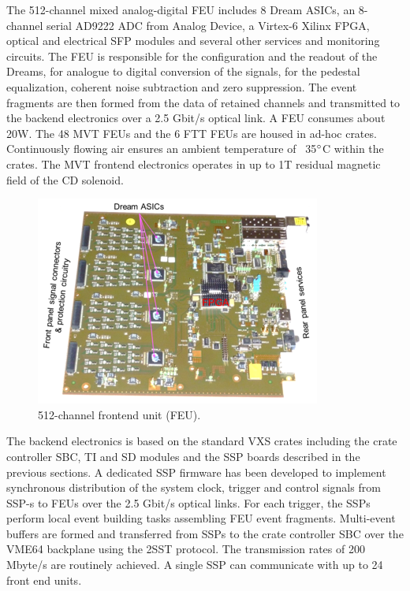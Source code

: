The 512-channel mixed analog-digital FEU includes 8 Dream ASICs, an 8-channel serial AD9222 ADC from Analog Device, a Virtex-6 Xilinx FPGA, optical and electrical SFP modules and several other services and monitoring circuits. The FEU is responsible for the configuration and the readout of the Dreams, for analogue to digital conversion of the signals, for the pedestal equalization, coherent noise subtraction and zero suppression. The event fragments are then formed from the data of retained channels and transmitted to the backend electronics over a 2.5 Gbit/s optical link. A FEU consumes about 20W. The 48 MVT FEUs and the 6 FTT FEUs are housed in ad-hoc crates. Continuously flowing air ensures an ambient temperature of ~35$\degree$C within the crates. The MVT frontend electronics operates in up to 1T residual magnetic field of the CD solenoid.

\begin{figure}[hbt]
	\centering
	\includegraphics[width=1.0\columnwidth,keepaspectratio]{img/mvt2.png}
	\caption{512-channel frontend unit (FEU).}
	\label{fig:mvt2}
\end{figure}

The backend electronics is based on the standard VXS crates including the crate controller SBC, TI and SD modules and the SSP boards described in the previous sections. A dedicated SSP firmware has been developed to implement synchronous distribution of the system clock, trigger and control signals from SSP-s to FEUs over the 2.5 Gbit/s optical links. For each trigger, the SSPs perform local event building tasks assembling FEU event fragments. Multi-event buffers are formed and transferred from SSPs to the crate controller SBC over the VME64 backplane using the 2SST protocol. The transmission rates of 200 Mbyte/s are routinely achieved. A single SSP can communicate with up to 24 front end units.

